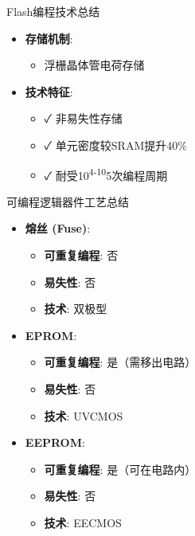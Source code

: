 \documentclass[
  ignorenonframetext,
  chinese,
]{beamer}
\providecommand{\tightlist}{%
  \setlength{\itemsep}{0pt}\setlength{\parskip}{0pt}}
\begin{document}
\begin{frame}
\begin{block}{Flash编程技术总结}
\label{flashux7f16ux7a0bux6280ux672fux603bux7ed3}
\begin{itemize}
\tightlist
\item
  \textbf{存储机制}:

  \begin{itemize}
  \tightlist
  \item
    浮栅晶体管电荷存储
  \end{itemize}
\item
  \textbf{技术特征}:

  \begin{itemize}
  \tightlist
  \item
    ✓ 非易失性存储\\
  \item
    ✓ 单元密度较SRAM提升40\%\\
  \item
    ✓ 耐受10\textsuperscript{4-10}5次编程周期
  \end{itemize}
\end{itemize}
\end{block}
\end{frame}

\begin{frame}
\begin{block}{可编程逻辑器件工艺总结}
\label{ux53efux7f16ux7a0bux903bux8f91ux5668ux4ef6ux5de5ux827aux603bux7ed3}
\begin{itemize}
\tightlist
\item
  \textbf{熔丝 (Fuse)}:

  \begin{itemize}
  \tightlist
  \item
    \textbf{可重复编程}: 否
  \item
    \textbf{易失性}: 否
  \item
    \textbf{技术}: 双极型
  \end{itemize}
\item
  \textbf{EPROM}:

  \begin{itemize}
  \tightlist
  \item
    \textbf{可重复编程}: 是（需移出电路）
  \item
    \textbf{易失性}: 否
  \item
    \textbf{技术}: UVCMOS
  \end{itemize}
\item
  \textbf{EEPROM}:

  \begin{itemize}
  \tightlist
  \item
    \textbf{可重复编程}: 是（可在电路内）
  \item
    \textbf{易失性}: 否
  \item
    \textbf{技术}: EECMOS
  \end{itemize}
\end{itemize}
\end{block}
\end{frame}
\end{document}
